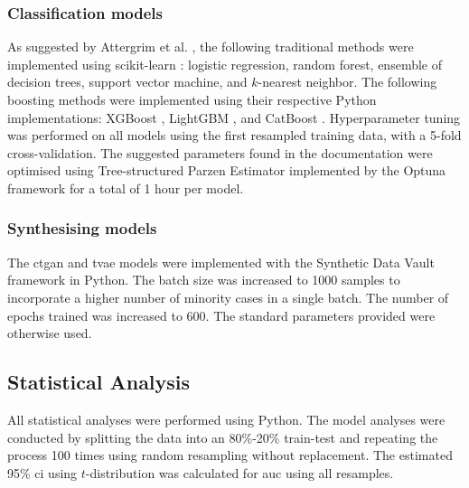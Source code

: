\documentclass[12pt, a4paper]{article}
\begin{document}
\subsubsection*{Classification models}
As suggested by Attergrim et al. \cite{attergrim_predicting_2023}, the following traditional methods were implemented using scikit-learn \cite{pedregosa_scikit_2011}: logistic regression, random forest, ensemble of decision trees, support vector machine, and $k$-nearest neighbor. The following boosting methods were implemented using their respective Python implementations: XGBoost \cite{chen_xgboost_2016}, LightGBM \cite{ke_lightgbm_2017}, and CatBoost \cite{prokhorenkova_catboost_2018}. Hyperparameter tuning was performed on all models using the first resampled training data, with a 5-fold cross-validation. The suggested parameters found in the documentation were optimised using Tree-structured Parzen Estimator \cite{bergstra_algorithms_2011} implemented by the Optuna framework \cite{optuna_2019} for a total of 1 hour per model.

\subsubsection*{Synthesising models}
The \acrfull{ctgan} \cite{xu_modeling_2019} and \acrfull{tvae} \cite{ishfaq_tvae_2018} models were implemented with the Synthetic Data Vault framework \cite{patki_sdv_2016} in Python. The batch size was increased to 1000 samples to incorporate a higher number of minority cases in a single batch. The number of epochs trained was increased to 600. The standard parameters provided were otherwise used.

\subsection{Statistical Analysis}
All statistical analyses were performed using Python. The model analyses were conducted by splitting the data into an
80\%-20\% train-test and repeating the process 100 times using random resampling without replacement. The estimated
95\% \acrfull{ci} using $t$-distribution was calculated for \acrfull{auc} using all resamples.
\end{document}
